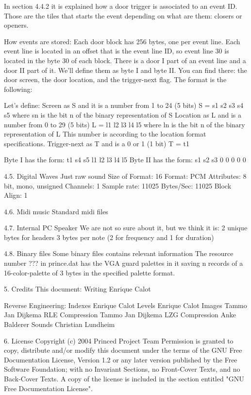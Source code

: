  In section 4.4.2 it is explained how a door trigger is associated to an
 event ID. Those are the tiles that starts the event depending on what are
 them: closers or openers.

 How events are stored:
 Each door block has 256 bytes, one per event line. Each event line is
 located in an offset that is the event line ID, so event line 30 is
 located in the byte 30 of each block.
 There is a door I part of an event line and a door II part of it. We'll
 define them as byte I and byte II.
 You can find there: the door screen, the door location, and the
 trigger-next flag. The format is the following:
 
 Let's define:
  Screen as S and it is a number from 1 to 24 (5 bits)
   S = s1 s2 s3 s4 s5
	  where sn is the bit n of the binary representation of S
	Location as L and is a number from 0 to 29 (5 bits)
   L = l1 l2 l3 l4 l5
	  where ln is the bit n of the binary representation of L
   This number is according to the location format specifications.
	Trigger-next as T and is a 0 or 1 (1 bit)
   T = t1

 Byte I  has the form: t1 s4 s5 l1 l2 l3 l4 l5
 Byte II has the form: s1 s2 s3  0  0  0  0  0

4.5. Digital Waves
Just raw sound
 Size of Format: 16
 Format: PCM
 Attributes: 8 bit, mono, unsigned
 Channels: 1
 Sample rate: 11025
 Bytes/Sec: 11025
 Block Align: 1
 
4.6. Midi music
 Standard midi files

4.7. Internal PC Speaker
 We are not so sure about it, but we think it is:
  2 unique bytes for headers
  3 bytes per note (2 for frequency and 1 for duration)
 
4.8. Binary files
 Some binary files contains relevant information
 The resource number ??? in prince.dat has the VGA guard palettes in it
 saving n records of a 16-color-palette of 3 bytes in the specified palette
 format.

5. Credits
 This document:
  Writing                    Enrique Calot

 Reverse Engineering:
  Indexes                    Enrique Calot
  Levels                     Enrique Calot
  Images                 Tammo Jan Dijkema
  RLE Compression        Tammo Jan Dijkema
  LZG Compression            Anke Balderer
  Sounds                Christian Lundheim

6. License
      Copyright (c)  2004  Princed Project Team
      Permission is granted to copy, distribute and/or modify this document
      under the terms of the GNU Free Documentation License, Version 1.2
      or any later version published by the Free Software Foundation;
      with no Invariant Sections, no Front-Cover Texts, and no Back-Cover
      Texts.  A copy of the license is included in the section entitled
			"GNU Free Documentation License".

